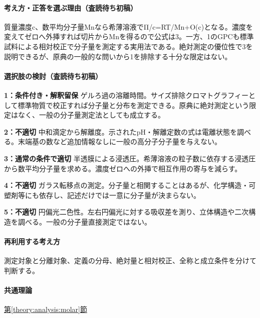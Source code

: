 \paragraph{考え方・正答を選ぶ理由（査読待ち初稿）} 質量濃度c、数平均分子量Mnなら希薄溶液でΠ/c=\allowbreak{}RT/Mn+O(c)となる。濃度を変えてゼロへ外挿すれば切片からMnを得るので公式は3。一方、1のGPCも標準試料による相対校正で分子量を測定する実用法である。絶対測定の優位性で3を説明できるが、原典の一般的な問いから1を排除する十分な限定はない。

\paragraph{選択肢の検討（査読待ち初稿）}\mbox{}\par

\noindent\textbf{1：条件付き・解釈留保} ゲルろ過の溶離時間。サイズ排除クロマトグラフィーとして標準物質で校正すれば分子量と分布を測定できる。原典に絶対測定という限定はなく、一般の分子量測定法としても成立する。\par

\noindent\textbf{2：不適切} 中和滴定から解離度。示されたpH・解離定数の式は電離状態を調べる。末端基の数など追加情報なしに一般の高分子分子量を与えない。\par

\noindent\textbf{3：通常の条件で適切} 半透膜による浸透圧。希薄溶液の粒子数に依存する浸透圧から数平均分子量を求める。濃度ゼロへの外挿で相互作用の寄与を減らす。\par

\noindent\textbf{4：不適切} ガラス転移点の測定。分子量と相関することはあるが、化学構造・可塑剤等にも依存し、記述だけでは一意に分子量が決まらない。\par

\noindent\textbf{5：不適切} 円偏光二色性。左右円偏光に対する吸収差を測り、立体構造や二次構造を調べる。一般の分子量直接測定ではない。\par

\paragraph{再利用する考え方} 測定対象と分離対象、定義の分母、絶対量と相対校正、全称と成立条件を分けて判断する。

\paragraph{共通理論} \hyperref[theory:analysis:molar]{第\ref*{theory:analysis:molar}節}

